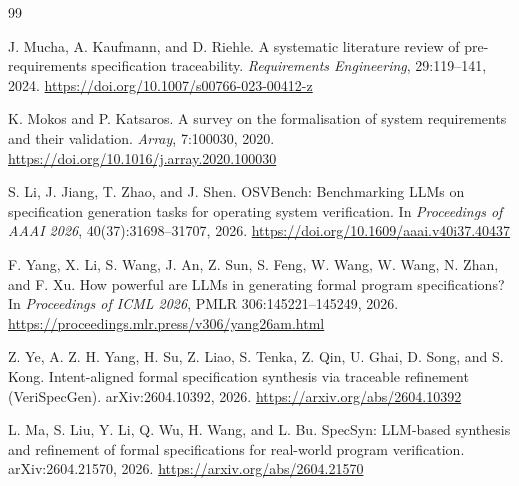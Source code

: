 
\begin{thebibliography}{99}

J. Mucha, A. Kaufmann, and D. Riehle.
\newblock A systematic literature review of pre-requirements specification traceability.
\newblock \emph{Requirements Engineering}, 29:119--141, 2024.
\newblock \url{https://doi.org/10.1007/s00766-023-00412-z}

K. Mokos and P. Katsaros.
\newblock A survey on the formalisation of system requirements and their validation.
\newblock \emph{Array}, 7:100030, 2020.
\newblock \url{https://doi.org/10.1016/j.array.2020.100030}

S. Li, J. Jiang, T. Zhao, and J. Shen.
\newblock OSVBench: Benchmarking LLMs on specification generation tasks for operating
system verification.
\newblock In \emph{Proceedings of AAAI 2026}, 40(37):31698--31707, 2026.
\newblock \url{https://doi.org/10.1609/aaai.v40i37.40437}

F. Yang, X. Li, S. Wang, J. An, Z. Sun, S. Feng, W. Wang, W. Wang, N. Zhan, and F. Xu.
\newblock How powerful are LLMs in generating formal program specifications?
\newblock In \emph{Proceedings of ICML 2026}, PMLR 306:145221--145249, 2026.
\newblock \url{https://proceedings.mlr.press/v306/yang26am.html}

Z. Ye, A. Z. H. Yang, H. Su, Z. Liao, S. Tenka, Z. Qin, U. Ghai, D. Song, and S. Kong.
\newblock Intent-aligned formal specification synthesis via traceable refinement
(VeriSpecGen).
\newblock arXiv:2604.10392, 2026.
\newblock \url{https://arxiv.org/abs/2604.10392}

L. Ma, S. Liu, Y. Li, Q. Wu, H. Wang, and L. Bu.
\newblock SpecSyn: LLM-based synthesis and refinement of formal specifications for
real-world program verification.
\newblock arXiv:2604.21570, 2026.
\newblock \url{https://arxiv.org/abs/2604.21570}


\end{thebibliography}
